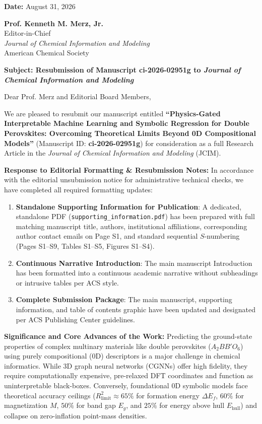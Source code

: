 \documentclass[11pt,a4paper]{article}
\begin{document}
\begin{flushright}
\textbf{Date:} August 31, 2026
\end{flushright}

\textbf{Prof. Kenneth M. Merz, Jr.}\\
Editor-in-Chief\\
\textit{Journal of Chemical Information and Modeling}\\
American Chemical Society

\bigskip

\textbf{Subject: Resubmission of Manuscript ci-2026-02951g to \textit{Journal of Chemical Information and Modeling}}

\bigskip

Dear Prof. Merz and Editorial Board Members,

We are pleased to resubmit our manuscript entitled \textbf{``Physics-Gated Interpretable Machine Learning and Symbolic Regression for Double Perovskites: Overcoming Theoretical Limits Beyond 0D Compositional Models''} (Manuscript ID: \textbf{ci-2026-02951g}) for consideration as a full Research Article in the \textit{Journal of Chemical Information and Modeling} (JCIM).

\textbf{Response to Editorial Formatting \& Resubmission Notes:}
In accordance with the editorial unsubmission notice for administrative technical checks, we have completed all required formatting updates:
\begin{enumerate}
    \item \textbf{Standalone Supporting Information for Publication}: A dedicated, standalone PDF (\texttt{supporting\_information.pdf}) has been prepared with full matching manuscript title, authors, institutional affiliations, corresponding author contact emails on Page S1, and standard sequential $S$-numbering (Pages S1--S9, Tables S1--S5, Figures S1--S4).
    \item \textbf{Continuous Narrative Introduction}: The main manuscript Introduction has been formatted into a continuous academic narrative without subheadings or intrusive tables per ACS style.
    \item \textbf{Complete Submission Package}: The main manuscript, supporting information, and table of contents graphic have been updated and designated per ACS Publishing Center guidelines.
\end{enumerate}

\textbf{Significance and Core Advances of the Work:}
Predicting the ground-state properties of complex multinary materials like double perovskites ($A_2BB'O_6$) using purely compositional (0D) descriptors is a major challenge in chemical informatics. While 3D graph neural networks (CGNNs) offer high fidelity, they require computationally expensive, pre-relaxed DFT coordinates and function as uninterpretable black-boxes. Conversely, foundational 0D symbolic models face theoretical accuracy ceilings ($R^2_{\text{limit}} \approx 65\%$ for formation energy $\Delta E_f$, $60\%$ for magnetization $M$, $50\%$ for band gap $E_g$, and $25\%$ for energy above hull $E_{\text{hull}}$) and collapse on zero-inflation point-mass densities.
\end{document}

